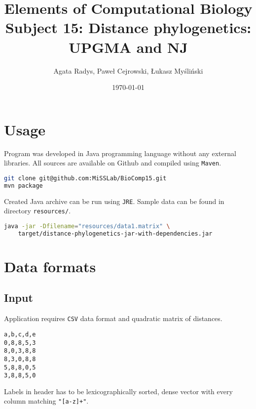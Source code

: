 \documentclass[a4paper,10pt]{article}
\title{Elements of Computational Biology\\ \Large
Subject 15: Distance phylogenetics: UPGMA and NJ}
\author{Agata Radys, Paweł Cejrowski, Łukasz Myśliński}
\date{\today}
\begin{document}
\maketitle

\section{Usage}
Program was developed in Java programming language without any external libraries. All sources are available on Github and compiled using \texttt{Maven}.
\begin{lstlisting}[language=bash,caption={Building project}]
git clone git@github.com:MiSSLab/BioComp15.git
mvn package
\end{lstlisting}
Created Java archive can be run using \texttt{JRE}. Sample data can be found in directory \texttt{resources/}.
\begin{lstlisting}[language=bash,caption={Running project using data1.matrix}]
java -jar -Dfilename="resources/data1.matrix" \
    target/distance-phylogenetics-jar-with-dependencies.jar
\end{lstlisting}

\section{Data formats}
\subsection{Input}
Application requires \texttt{CSV} data format and quadratic matrix of distances.

\begin{lstlisting}[caption={Example data file content}]
a,b,c,d,e
0,8,8,5,3
8,0,3,8,8
8,3,0,8,8
5,8,8,0,5
3,8,8,5,0
\end{lstlisting}
Labels in header has to be lexicographically sorted, dense vector with every column matching \texttt{"[a-z]+"}.
\newpage
\end{document}
